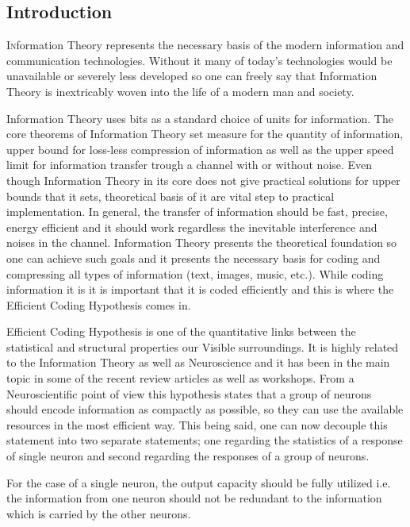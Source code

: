 \documentclass[twoside]{article}
\begin{document}
\begin{multicols}{2} %

\section{Introduction}

\lettrine[nindent=0em,lines=3]{I}nformation Theory represents the necessary basis of the modern information and communication technologies. Without it many of today's technologies would be unavailable or severely less developed so one can freely say that Information Theory is inextricably woven into the life of a modern man and society.

Information Theory uses bits as a standard choice of units for information.
The core theorems of Information Theory set measure for the quantity of information, upper bound for loss-less compression of information as well as the upper speed limit for information transfer trough a channel with or without noise. Even though Information Theory in its core does not give practical solutions for upper bounds that it sets, theoretical basis of it are vital step to practical implementation.  In general, the transfer of information should be fast, precise, energy efficient and it should work regardless the inevitable interference and noises in the channel. Information Theory presents the theoretical foundation so one can achieve such goals and it presents the necessary basis for coding and compressing all types of information (text, images, music, etc.). While coding information it is it is important that it is coded efficiently and this is where the Efficient Coding Hypothesis comes in. 

Efficient Coding Hypothesis is one of the quantitative links between the statistical and structural properties our Visible surroundings. It is highly related to the Information Theory as well as Neuroscience and it has been in the main topic in some of the recent review articles as well as workshops. 
From a Neuroscientific point of view this hypothesis states that a group of neurons should encode information as compactly as possible, so they can use the available resources in the most efficient way. This being said, one can now decouple this statement into two separate statements; one regarding the statistics of a response of single neuron and second regarding the responses of a group of neurons. 

For the case of a single neuron, the output capacity should be fully utilized i.e. the information from one neuron should not be redundant to the information which is carried by the other neurons. 


\end{multicols}
\end{document}
